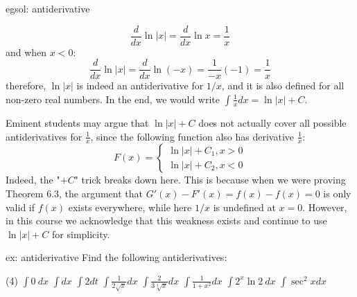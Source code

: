 \begin{egsol}[]{egsol: antiderivative}
\begin{enumerate}[a)]
        \[\frac{d}{dx} \ln |x| = \frac{d}{dx} \ln x = \frac{1}{x}\]
        and when $x < 0$:
        \[\frac{d}{dx} \ln |x| = \frac{d}{dx} \ln (-x) = \frac{1}{-x}(-1) = \frac{1}{x}\]
        therefore, $\ln |x|$ is indeed an antiderivative for $1/x$, and it is also defined for all non-zero real numbers.  In the end, we would write $\int \frac{1}{x} dx = \ln |x| + C$.
    \end{enumerate}
\end{egsol}

\bigskip

Eminent students may argue that $\ln |x| + C$ does not actually cover all possible antiderivatives for $\frac{1}{x}$, since the following function also has derivative $\frac{1}{x}$:
\[F(x) = \begin{cases} \ln |x| + C_1, x > 0 \\ \ln |x| + C_2, x < 0 \end{cases}\]
Indeed, the "$+C$" trick breaks down here.  This is because when we were proving Theorem 6.3, the argument that $G'(x) - F'(x) = f(x) - f(x) = 0$ is only valid if $f(x)$ exists everywhere, while here $1/x$ is undefined at $x = 0$.  However, in this course we acknowledge that this weakness exists and continue to use $\ln |x| + C$ for simplicity.

\bigskip

\begin{ex}[]{ex: antiderivative}
    Find the following antiderivatives:
    \begin{tasks}(4)
        \task $\int 0~dx$
        \task $\int dx$
        \task $\int 2dt$
        \task $\int \frac{1}{2\sqrt{x}} dx$
        \task $\int \frac{2}{3\sqrt[3]{x}} dx$
        \task $\int \frac{1}{1+x^2} dx$
        \task $\int 2^x \ln 2~dx$
        \task $\int \sec^2 x dx$
    \end{tasks}
\end{ex}

